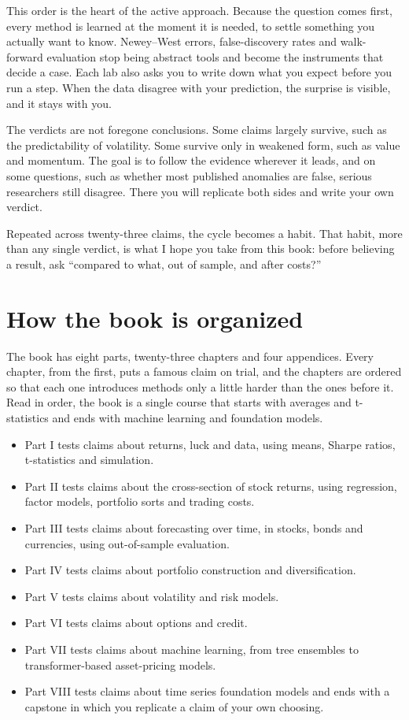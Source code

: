 This order is the heart of the active approach. Because the question comes first, every method is learned at the moment it is needed, to settle something you actually want to know. Newey--West errors, false-discovery rates and walk-forward evaluation stop being abstract tools and become the instruments that decide a case. Each lab also asks you to write down what you expect before you run a step. When the data disagree with your prediction, the surprise is visible, and it stays with you.

The verdicts are not foregone conclusions. Some claims largely survive, such as the predictability of volatility. Some survive only in weakened form, such as value and momentum. The goal is to follow the evidence wherever it leads, and on some questions, such as whether most published anomalies are false, serious researchers still disagree. There you will replicate both sides and write your own verdict.

Repeated across twenty-three claims, the cycle becomes a habit. That habit, more than any single verdict, is what I hope you take from this book: before believing a result, ask ``compared to what, out of sample, and after costs?''

\section*{How the book is organized}

The book has eight parts, twenty-three chapters and four appendices. Every chapter, from the first, puts a famous claim on trial, and the chapters are ordered so that each one introduces methods only a little harder than the ones before it. Read in order, the book is a single course that starts with averages and t-statistics and ends with machine learning and foundation models.

\begin{itemize}
  \item Part I tests claims about returns, luck and data, using means, Sharpe ratios, t-statistics and simulation.
  \item Part II tests claims about the cross-section of stock returns, using regression, factor models, portfolio sorts and trading costs.
  \item Part III tests claims about forecasting over time, in stocks, bonds and currencies, using out-of-sample evaluation.
  \item Part IV tests claims about portfolio construction and diversification.
  \item Part V tests claims about volatility and risk models.
  \item Part VI tests claims about options and credit.
  \item Part VII tests claims about machine learning, from tree ensembles to transformer-based asset-pricing models.
  \item Part VIII tests claims about time series foundation models and ends with a capstone in which you replicate a claim of your own choosing.
\end{itemize}

